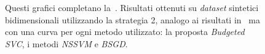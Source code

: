 \begin{appendices}
\begin{figure}[ht]
\begin{subfigure}{.8\textwidth}
    \end{subfigure}
 \caption[Risultati su \emph{dataset} sintetici utilizzando strategia 2 in confronto ad altri metodi.]{Questi grafici completano la~. Risultati ottenuti su \emph{dataset} sintetici bidimensionali utilizzando la strategia 2, analogo ai risultati in~ ma con una curva per ogni metodo utilizzato: la proposta \emph{Budgeted SVC}, i metodi \emph{NSSVM} e \emph{BSGD}.}

\end{figure}


\end{appendices}